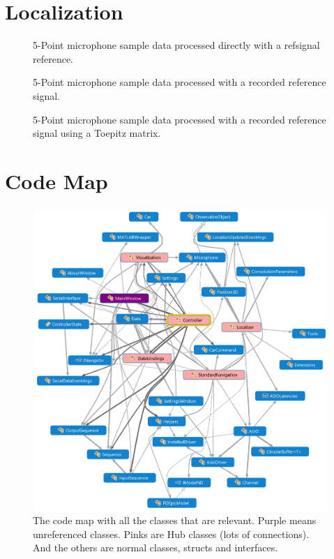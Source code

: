 \documentclass[final]{scrreprt} %
\begin{document}
\begin{appendices}
\chapter{Localization}
\label{app:localization}
\begin{figure}[H]
	\centering
	\setlength\figureheight{3cm}
    	\setlength{}
	
	\caption{5-Point microphone sample data processed directly with a refsignal reference.}
	\label{fig:orgref}
\end{figure}

\begin{figure}[H]
	\centering
	\setlength\figureheight{3cm}
    	\setlength{}
	
	\caption{5-Point microphone sample data processed with a recorded reference signal.}
	\label{fig:no-toep}
\end{figure}

\begin{figure}[H]
	\centering
	\setlength\figureheight{3cm}
    	\setlength{}
	
	\caption{5-Point microphone sample data processed with a recorded reference signal using a Toepitz matrix.}
	\label{fig:toep}
\end{figure}

\chapter{Code Map}
\label{app:code-map}
\begin{figure}[h]
\centering
	\includegraphics[width=\linewidth]{resources/code-map.jpg}
	\caption{The code map with all the classes that are relevant. Purple means unreferenced classes. Pinks are Hub classes (lots of connections). And the others are normal classes, structs and interfaces.}
	\label{fig:code-map}
\end{figure}


\end{appendices}
\end{document}
